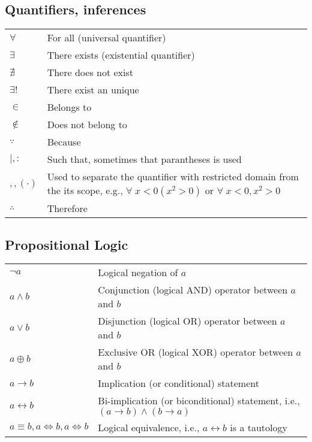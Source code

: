 \documentclass{article}
\begin{document}
\subsection{Quantifiers, inferences}
\begin{xltabular}{\textwidth}{XX}
    \(\forall\) & For all (universal quantifier) \cite{grahamConcreteMathematicsFoundation1989}\\
    \(\exists\) & There exists (existential quantifier) \cite{grahamConcreteMathematicsFoundation1989}\\
    \(\nexists\) & There does not exist \cite{grahamConcreteMathematicsFoundation1989}\\
    \(\exists!\) & There exist an unique \cite{grahamConcreteMathematicsFoundation1989}\\
    \(\in\) & Belongs to \cite{grahamConcreteMathematicsFoundation1989}\\
    \(\not\in\) & Does not belong to \cite{grahamConcreteMathematicsFoundation1989}\\
    \(\because\) & Because \cite{grahamConcreteMathematicsFoundation1989}\\
    \(\mid, :\) & Such that, sometimes that parantheses is used \cite{grahamConcreteMathematicsFoundation1989}\\
    \(, , \left( \cdot \right)\) & Used to separate the quantifier with restricted domain from the its scope, e.g., \(\forall \; x < 0 \left( x^{2} > 0 \right)\) or \(\forall \; x < 0, x^{2} > 0\) \cite{grahamConcreteMathematicsFoundation1989}\\
    \(\therefore\) & Therefore \cite{grahamConcreteMathematicsFoundation1989}\\
\end{xltabular}

\subsection{Propositional Logic}
\begin{xltabular}{\textwidth}{XX}
    \(\lnot a\) & Logical negation of \(a\) \cite{rosenDiscreteMathematicsIts2011}\\
    \(a \wedge b\) & Conjunction (logical AND) operator between \(a\) and \(b\)\cite{rosenDiscreteMathematicsIts2011}\\
    \(a \vee b\) & Disjunction (logical OR) operator between \(a\) and \(b\)\cite{rosenDiscreteMathematicsIts2011}\\
    \(a \oplus b\) & Exclusive OR (logical XOR) operator between \(a\) and \(b\)\cite{rosenDiscreteMathematicsIts2011}\\
    \(a \rightarrow b\) & Implication (or conditional) statement\cite{rosenDiscreteMathematicsIts2011}\\
    \(a \leftrightarrow b\) & Bi-implication (or biconditional) statement, i.e., \(\left( a \rightarrow b \right) \wedge (b \rightarrow a )\) \cite{rosenDiscreteMathematicsIts2011}\\
    \(a \equiv b, a \iff b, a \Leftrightarrow b \) & Logical equivalence, i.e., \(a \leftrightarrow b\) is a tautology\cite{rosenDiscreteMathematicsIts2011}\\
\end{xltabular}
\end{document}
